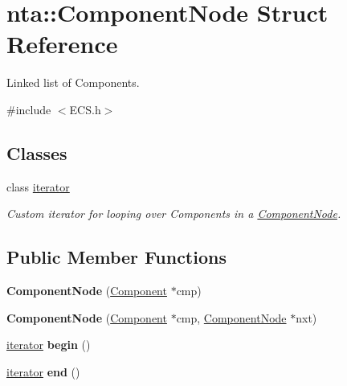 \hypertarget{structnta_1_1ComponentNode}{}\section{nta\+:\+:Component\+Node Struct Reference}
\label{structnta_1_1ComponentNode}


Linked list of Components.  




{\ttfamily \#include $<$E\+C\+S.\+h$>$}

\subsection*{Classes}
\begin{DoxyCompactItemize}
\item 
class \hyperlink{classnta_1_1ComponentNode_1_1iterator}{iterator}
\begin{DoxyCompactList}\small\item\em Custom iterator for looping over Components in a \hyperlink{structnta_1_1ComponentNode}{Component\+Node}. \end{DoxyCompactList}\end{DoxyCompactItemize}
\subsection*{Public Member Functions}
\begin{DoxyCompactItemize}
\item 
\mbox{\label{structnta_1_1ComponentNode_a8190ef084705e1174f8a3da02ab734c8}} 
{\bfseries Component\+Node} (\hyperlink{classnta_1_1Component}{Component} $\ast$cmp)
\item 
\mbox{\label{structnta_1_1ComponentNode_af547f158377486d1601a4e7f795cdf24}} 
{\bfseries Component\+Node} (\hyperlink{classnta_1_1Component}{Component} $\ast$cmp, \hyperlink{structnta_1_1ComponentNode}{Component\+Node} $\ast$nxt)
\item 
\mbox{\label{structnta_1_1ComponentNode_a435a3d186b29a901cee363bcd05b5f02}} 
\hyperlink{classnta_1_1ComponentNode_1_1iterator}{iterator} {\bfseries begin} ()
\item 
\mbox{\label{structnta_1_1ComponentNode_ad1e237da4a6fd23335c1e51f7a6ec954}} 
\hyperlink{classnta_1_1ComponentNode_1_1iterator}{iterator} {\bfseries end} ()
\end{DoxyCompactItemize}

